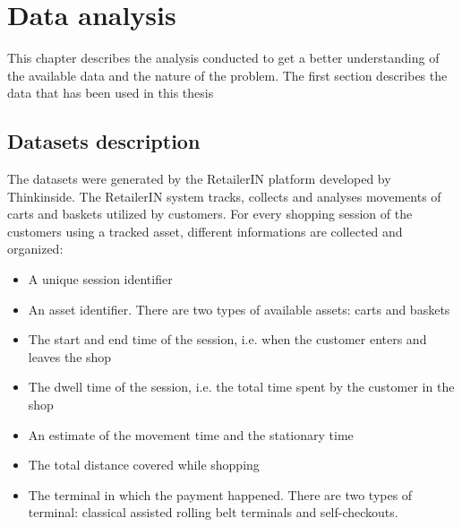 \chapter{Data analysis}
\label{cha:data_analysis}

This chapter describes the analysis conducted to get a better understanding of the available data and the nature of the problem. The first section describes the data that has been used in this thesis

\section{Datasets description}
\label{sec:datesets_description}
The datasets were generated by the RetailerIN platform developed by Thinkinside. The RetailerIN system tracks, collects and analyses movements of carts and baskets utilized by customers. For every shopping session of the customers using a tracked asset, different informations are collected and organized:
\begin{itemize}
  \item A unique session identifier
  \item An asset identifier. There are two types of available assets: carts and baskets
  \item The start and end time of the session, i.e. when the customer enters and leaves the shop
  \item The dwell time of the session, i.e. the total time spent by the customer in the shop
  \item An estimate of the movement time and the stationary time
  \item The total distance covered while shopping
  \item The terminal in which the payment happened. There are two types of terminal: classical assisted rolling belt terminals and self-checkouts.
\end{itemize}

